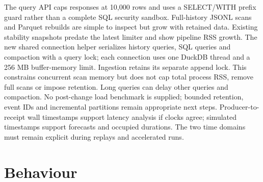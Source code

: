 \documentclass[11pt,a4paper]{article}
\begin{document}
The query API caps responses at 10,000 rows and uses a SELECT/WITH prefix guard rather than a complete SQL security sandbox. Full-history JSONL scans and Parquet rebuilds are simple to inspect but grow with retained data. Existing stability snapshots predate the latest limiter and show pipeline RSS growth. The new shared connection helper serializes history queries, SQL queries and compaction with a query lock; each connection uses one DuckDB thread and a 256 MB buffer-memory limit. Ingestion retains its separate append lock. This constrains concurrent scan memory but does not cap total process RSS, remove full scans or impose retention. Long queries can delay other queries and compaction. No post-change load benchmark is supplied; bounded retention, event IDs and incremental partitions remain appropriate next steps. Producer-to-receipt wall timestamps support latency analysis if clocks agree; simulated timestamps support forecasts and occupied durations. The two time domains must remain explicit during replays and accelerated runs.

\section{Behaviour}
\end{document}
